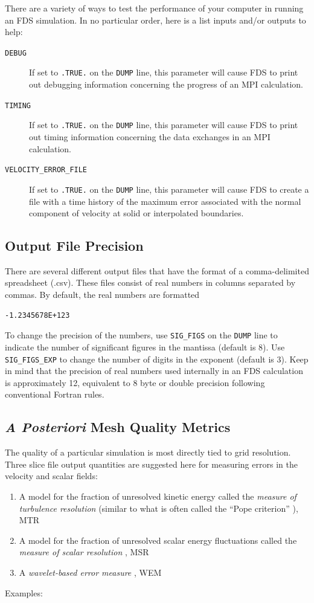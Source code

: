 \documentclass[11pt]{book}
\newcommand{\ct}{\tt\small}
\begin{document}
There are a variety of ways to test the performance of your computer in running an FDS simulation. In no particular order, here is a list inputs and/or outputs to help:
\begin{description}
\item[{\ct DEBUG}]  If set to {\ct .TRUE.} on the {\ct DUMP} line, this parameter will cause FDS to print out debugging information concerning the progress of an MPI
calculation.
\item[{\ct TIMING}] If set to {\ct .TRUE.} on the {\ct DUMP} line, this parameter will cause FDS to print out timing information concerning the data exchanges in an MPI
calculation.
\item[{\ct VELOCITY\_ERROR\_FILE}] If set to {\ct .TRUE.} on the {\ct DUMP} line, this parameter will cause FDS to create a file with a time history of the maximum error
associated with the normal component of velocity at solid or interpolated boundaries.
\end{description}


\subsection{Output File Precision}
\label{info:SIG_FIGS}

There are several different output files that have the format of a comma-delimited spreadsheet (.csv). These files consist of real numbers in columns separated by
commas. By default, the real numbers are formatted

\begin{verbatim}
-1.2345678E+123
\end{verbatim}

\noindent
To change the precision of the numbers, use {\ct SIG\_FIGS} on the {\ct DUMP} line to indicate the number of significant figures in the mantissa (default is 8). Use
{\ct SIG\_FIGS\_EXP} to change the number of digits in the exponent (default is 3). Keep in mind that the precision of real numbers used internally in an FDS calculation
is approximately 12, equivalent to 8 byte or double precision following conventional Fortran rules.


\subsection{\emph{A Posteriori} Mesh Quality Metrics}
\label{info:meshquality}
The quality of a particular simulation is most directly tied to grid resolution.  Three slice file output quantities are suggested here for measuring errors in the velocity and scalar fields:
\begin{enumerate}
\item A model for the fraction of unresolved kinetic energy called the \emph{measure of turbulence resolution} (similar to what is often called the ``Pope criterion'' \cite{Pope:2004}), MTR
\item A model for the fraction of unresolved scalar energy fluctuations called the \emph{measure of scalar resolution} \cite{Vervisch:2010}, MSR
\item A \emph{wavelet-based error measure} \cite{McDermott:2010}, WEM
\end{enumerate}
Examples:
\end{document}
